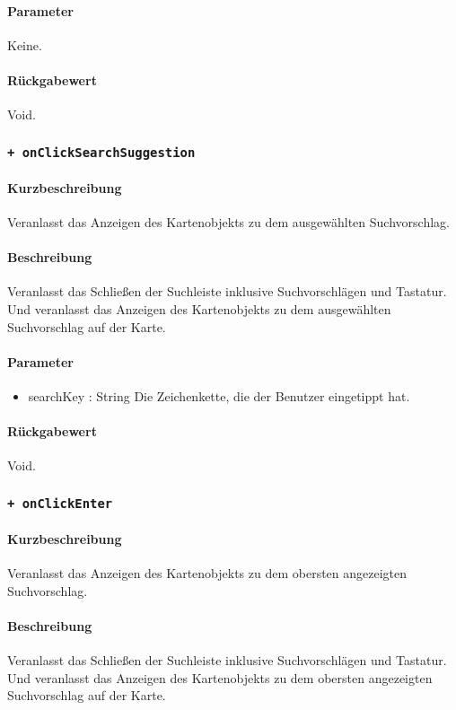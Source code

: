 \paragraph*{Parameter}
Keine.
\paragraph*{Rückgabewert}
Void.

\subsubsection*{\texttt{+ onClickSearchSuggestion}}%
\paragraph*{Kurzbeschreibung}
Veranlasst das Anzeigen des Kartenobjekts zu dem ausgewählten Suchvorschlag.
\paragraph*{Beschreibung}
Veranlasst das Schließen der Suchleiste inklusive Suchvorschlägen und Tastatur.
Und veranlasst das Anzeigen des Kartenobjekts zu dem ausgewählten Suchvorschlag auf der Karte.
\paragraph*{Parameter}
\begin{itemize}
    \item searchKey : String Die Zeichenkette, die der Benutzer eingetippt hat.
\end{itemize}
\paragraph*{Rückgabewert}
Void.

\subsubsection*{\texttt{+ onClickEnter}}%
\paragraph*{Kurzbeschreibung}
Veranlasst das Anzeigen des Kartenobjekts zu dem obersten angezeigten Suchvorschlag.
\paragraph*{Beschreibung}
Veranlasst das Schließen der Suchleiste inklusive Suchvorschlägen und Tastatur.
Und veranlasst das Anzeigen des Kartenobjekts zu dem obersten angezeigten Suchvorschlag auf der Karte.
